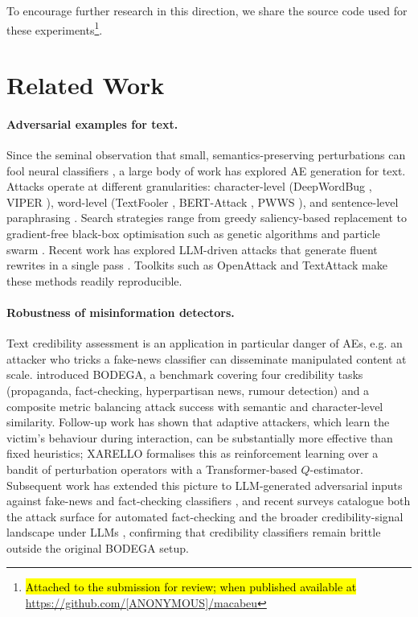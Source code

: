 \documentclass[11pt]{article}
\begin{document}
To encourage further research in this direction, we share the source code used for these experiments\footnote{\hl{Attached to the submission for review; when published available at} \url{https://github.com/[ANONYMOUS]/macabeu}}.

\section{Related Work}
\label{sec:related-work}
\paragraph{Adversarial examples for text.}
Since the seminal observation that small, semantics-preserving perturbations can fool neural classifiers \citep{Goodfellow2015, Szegedy2014}, a large body of work has explored AE generation for text. Attacks operate at different granularities: character-level (DeepWordBug \citep{Gao2018}, VIPER \citep{Eger2019}), word-level (TextFooler \citep{Jin2020}, BERT-Attack \citep{Li2020bert}, PWWS \citep{Ren2019}), and sentence-level paraphrasing \citep{Iyyer2018}. Search strategies range from greedy saliency-based replacement to gradient-free black-box optimisation such as genetic algorithms \citep{Alzantot2018} and particle swarm \citep{Zang2020}. Recent work has explored LLM-driven attacks that generate fluent rewrites in a single pass \citep{Moraffah2024purification, ZouUniversalLLM2023}. Toolkits such as OpenAttack \citep{Zeng2021} and TextAttack \citep{Morris2020} make these methods readily reproducible.


\paragraph{Robustness of misinformation detectors.}
Text credibility assessment \citep{Srba2026credibility} is an application in particular danger of AEs, e.g. an attacker who tricks a fake-news classifier can disseminate manipulated content at scale. \citet{verifying_robustness} introduced BODEGA, a benchmark covering four credibility tasks (propaganda, fact-checking, hyperpartisan news, rumour detection) and a composite metric balancing attack success with semantic and character-level similarity. Follow-up work has shown that adaptive attackers, which learn the victim's behaviour during interaction, can be substantially more effective than fixed heuristics; XARELLO \citep{przybyla-etal-2024-know} formalises this as reinforcement learning over a bandit of perturbation operators with a Transformer-based $Q$-estimator. Subsequent work has extended this picture to LLM-generated adversarial inputs against fake-news and fact-checking classifiers \citep{Bethany2025camouflage, Aldahoul2025multiagent, Przybyla2025LLMattack}, and recent surveys catalogue both the attack surface for automated fact-checking \citep{Liu2025fcsurvey} and the broader credibility-signal landscape under LLMs \citep{Srba2026credibility}, confirming that credibility classifiers remain brittle outside the original BODEGA setup.
\end{document}
